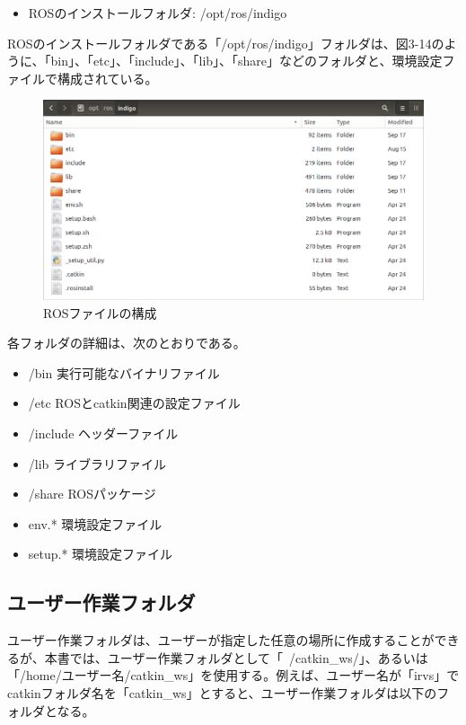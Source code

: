 \begin{itemize}
\item ROSのインストールフォルダ: /opt/ros/indigo
\end{itemize}

ROSのインストールフォルダである「/opt/ros/indigo」フォルダは、図3-14のように、「bin」、「etc」、「include」、「lib」、「share」などのフォルダと、環境設定ファイルで構成されている。

\begin{figure}[h]
  \centering
  \includegraphics[width=12cm]{pictures/chapter3/pic_03_14.png}
  \caption{ROSファイルの構成}
\end{figure}

各フォルダの詳細は、次のとおりである。

\begin{itemize}
\item /bin    実行可能なバイナリファイル
\item /etc    ROSとcatkin関連の設定ファイル
\item /include  ヘッダーファイル
\item /lib    ライブラリファイル
\item /share  ROSパッケージ
\item env.*   環境設定ファイル
\item setup.* 環境設定ファイル
\end{itemize}

\subsection{ユーザー作業フォルダ}

ユーザー作業フォルダは、ユーザーが指定した任意の場所に作成することができるが、本書では、ユーザー作業フォルダとして「~/catkin\_ws/」、あるいは「/home/ユーザー名/catkin\_ws」を使用する。例えば、ユーザー名が「irvs」でcatkinフォルダ名を「catkin\_ws」とすると、ユーザー作業フォルダは以下のフォルダとなる。

